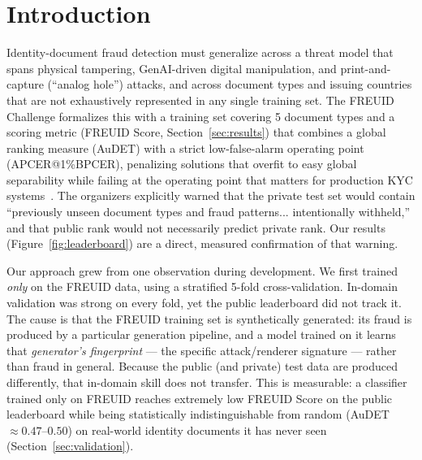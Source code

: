 \documentclass[11pt,a4paper]{article}
\begin{document}
\tableofcontents

\section{Introduction}
\label{sec:intro}
Identity-document fraud detection must generalize across a threat model that spans
physical tampering, GenAI-driven digital manipulation, and print-and-capture
(``analog hole'') attacks, and across document types and issuing countries that are
not exhaustively represented in any single training set. The FREUID Challenge
formalizes this with a training set covering 5 document types and a scoring metric
(FREUID Score, Section~\ref{sec:results}) that combines a global ranking measure
(AuDET) with a strict low-false-alarm operating point (APCER@1\%BPCER), penalizing
solutions that overfit to easy global separability while failing at the
operating point that matters for production KYC systems~\cite{freuid2026}. The
organizers explicitly warned that the private test set would contain
``previously unseen document types and fraud patterns... intentionally
withheld,'' and that public rank would not necessarily predict private rank.
Our results (Figure~\ref{fig:leaderboard}) are a direct, measured
confirmation of that warning.

Our approach grew from one observation during development. We first trained
\emph{only} on the FREUID data, using a stratified 5-fold cross-validation.
In-domain validation was strong on every fold, yet the public leaderboard did not
track it. The cause is that the FREUID training set is synthetically generated: its
fraud is produced by a particular generation pipeline, and a model trained on it
learns that \emph{generator's fingerprint} --- the specific attack/renderer
signature --- rather than fraud in general. Because the public (and private) test
data are produced differently, that in-domain skill does not transfer. This is
measurable: a classifier trained only on FREUID reaches extremely low FREUID Score
on the public leaderboard while being statistically indistinguishable from random
(AuDET $\approx 0.47$--$0.50$) on real-world identity documents it has never seen
(Section~\ref{sec:validation}).
\end{document}
